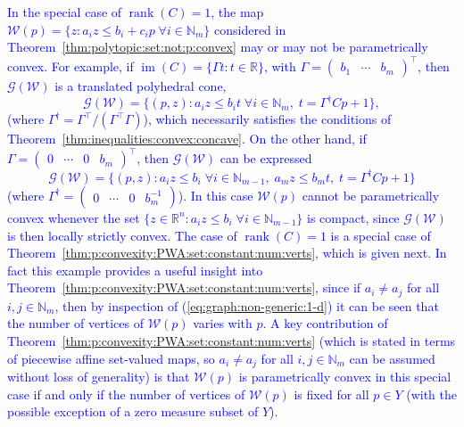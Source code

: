 \documentclass[smallextended]{svjour3}       %
\numberwithin{equation}{section}
\DeclareMathOperator{\rank}{rank}
\DeclareMathOperator{\image}{im}
\newcommand{\revision}[1]{\textcolor{blue}{#1}}
\begin{document}
\revision{In the special case of $\rank(C)=1$, the map $\mathcal W(p)=\{ z : a_i z \leq b_i + c_i p \; \forall i \in \mathbb N_m\}$ considered in Theorem~\ref{thm:polytopic:set:not:p:convex} may or may not be parametrically convex. For example, if $\image(C) = \{ \Gamma t : t\in\mathbb R\}$, with $\Gamma = (\begin{matrix} b_1 & \cdots & b_m\end{matrix})^\top$, then $\mathscr G(\mathcal W)$ is a translated polyhedral cone,
\[
\mathscr G(\mathcal W) = \{ (p , z) : a_i z \leq b_i t \; \forall i\in\mathbb N_m, \; t = \Gamma^\dagger C p + 1\} ,
\]
(where $\Gamma^\dagger = \Gamma^\top/(\Gamma^\top\Gamma)$),
which necessarily satisfies the conditions of Theorem~\ref{thm:inequalities:convex:concave}. On the other hand, if $\Gamma = (\begin{matrix} 0 & \cdots & 0 & b_m\end{matrix})^\top$, then $\mathscr G(\mathcal W)$ can be expressed
\begin{equation}\label{eq:graph:non-generic:1-d}
\mathscr G(\mathcal W) = \{ (p ,z): a_i z \leq b_i  \; \forall i\in\mathbb N_{m-1}, \; a_m z \leq b_m t ,\; t = \Gamma^\dagger C p + 1\} 
\end{equation}
(where $\Gamma^\dagger = (\begin{matrix} 0 & \cdots & 0 & b_m^{-1}\end{matrix})$).
In this case $\mathcal W(p)$ cannot be parametrically convex whenever the set $\{ z\in\mathbb R^n : a_iz \leq b_i \; \forall i\in\mathbb N_{m-1}\}$ is compact, since $\mathscr G(\mathcal W)$ is then locally strictly convex. The case of $\rank(C)=1$ is a special case of Theorem~\ref{thm:p:convexity:PWA:set:constant:num:verts}, which is given next. In fact this example provides a useful insight into Theorem~\ref{thm:p:convexity:PWA:set:constant:num:verts}, since if $a_i\neq a_j$ for all $i,j\in\mathbb N_m$, then by inspection of (\ref{eq:graph:non-generic:1-d}) it can be seen that 
the number of vertices of $\mathcal W(p)$ varies with $p$. A key contribution of Theorem~\ref{thm:p:convexity:PWA:set:constant:num:verts} (which is stated in terms of piecewise affine set-valued maps, so $a_i\neq a_j$ for all $i,j\in\mathbb N_m$ can be assumed without loss of generality) is that $\mathcal W(p)$ is parametrically convex in this special case if and only if the number of vertices of $\mathcal W(p)$ is fixed for all $p\in Y$ (with the possible exception of a zero measure subset of $Y$).}
\end{document}
